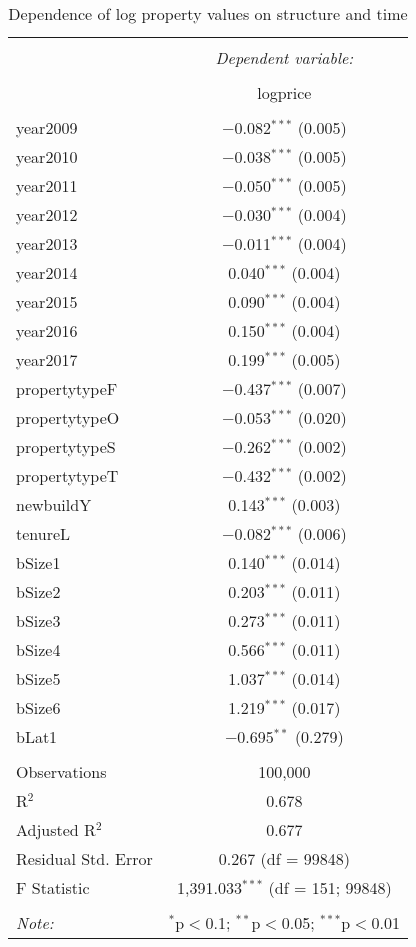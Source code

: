 \documentclass{article}\usepackage[]{graphicx}\usepackage[]{color}
\begin{document}
\begin{table}[!htbp] \centering 
  \caption{Dependence of log property values on structure and time} 
  \label{} 
\begin{tabular}{@{\extracolsep{5pt}}lc} 
\\[-1.8ex]\hline 
\hline \\[-1.8ex] 
 & \multicolumn{1}{c}{\textit{Dependent variable:}} \\ 
\cline{2-2} 
\\[-1.8ex] & logprice \\ 
\hline \\[-1.8ex] 
 year2009 & $-$0.082$^{***}$ (0.005) \\ 
  year2010 & $-$0.038$^{***}$ (0.005) \\ 
  year2011 & $-$0.050$^{***}$ (0.005) \\ 
  year2012 & $-$0.030$^{***}$ (0.004) \\ 
  year2013 & $-$0.011$^{***}$ (0.004) \\ 
  year2014 & 0.040$^{***}$ (0.004) \\ 
  year2015 & 0.090$^{***}$ (0.004) \\ 
  year2016 & 0.150$^{***}$ (0.004) \\ 
  year2017 & 0.199$^{***}$ (0.005) \\ 
  propertytypeF & $-$0.437$^{***}$ (0.007) \\ 
  propertytypeO & $-$0.053$^{***}$ (0.020) \\ 
  propertytypeS & $-$0.262$^{***}$ (0.002) \\ 
  propertytypeT & $-$0.432$^{***}$ (0.002) \\ 
  newbuildY & 0.143$^{***}$ (0.003) \\ 
  tenureL & $-$0.082$^{***}$ (0.006) \\ 
  bSize1 & 0.140$^{***}$ (0.014) \\ 
  bSize2 & 0.203$^{***}$ (0.011) \\ 
  bSize3 & 0.273$^{***}$ (0.011) \\ 
  bSize4 & 0.566$^{***}$ (0.011) \\ 
  bSize5 & 1.037$^{***}$ (0.014) \\ 
  bSize6 & 1.219$^{***}$ (0.017) \\ 
  bLat1 & $-$0.695$^{**}$ (0.279) \\ 
 \hline \\[-1.8ex] 
Observations & 100,000 \\ 
R$^{2}$ & 0.678 \\ 
Adjusted R$^{2}$ & 0.677 \\ 
Residual Std. Error & 0.267 (df = 99848) \\ 
F Statistic & 1,391.033$^{***}$ (df = 151; 99848) \\ 
\hline 
\hline \\[-1.8ex] 
\textit{Note:}  & \multicolumn{1}{r}{$^{*}$p$<$0.1; $^{**}$p$<$0.05; $^{***}$p$<$0.01} \\ 
\end{tabular} 
\end{table} 
\end{document}
